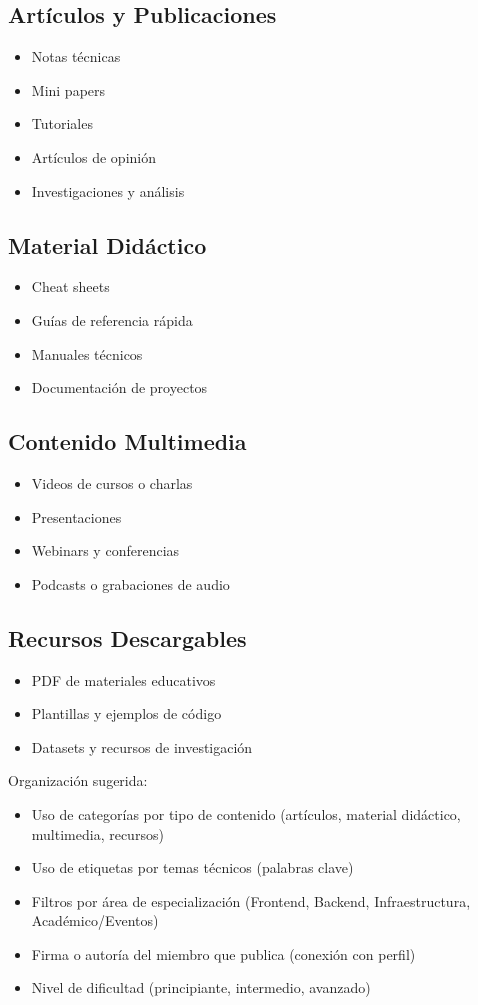 \documentclass[12pt]{article}
\begin{document}
\subsection{Artículos y Publicaciones}
\begin{itemize}[label=--]
    \item Notas técnicas
    \item Mini papers
    \item Tutoriales
    \item Artículos de opinión
    \item Investigaciones y análisis
\end{itemize}

\subsection{Material Didáctico}
\begin{itemize}[label=--]
    \item Cheat sheets
    \item Guías de referencia rápida
    \item Manuales técnicos
    \item Documentación de proyectos
\end{itemize}

\subsection{Contenido Multimedia}
\begin{itemize}[label=--]
    \item Videos de cursos o charlas
    \item Presentaciones
    \item Webinars y conferencias
    \item Podcasts o grabaciones de audio
\end{itemize}

\subsection{Recursos Descargables}
\begin{itemize}[label=--]
    \item PDF de materiales educativos
    \item Plantillas y ejemplos de código
    \item Datasets y recursos de investigación
\end{itemize}

Organización sugerida:
\begin{itemize}[label=--]
    \item Uso de categorías por tipo de contenido (artículos, material didáctico, multimedia, recursos)
    \item Uso de etiquetas por temas técnicos (palabras clave)
    \item Filtros por área de especialización (Frontend, Backend, Infraestructura, Académico/Eventos)
    \item Firma o autoría del miembro que publica (conexión con perfil)
    \item Nivel de dificultad (principiante, intermedio, avanzado)
\end{itemize}
\end{document}
